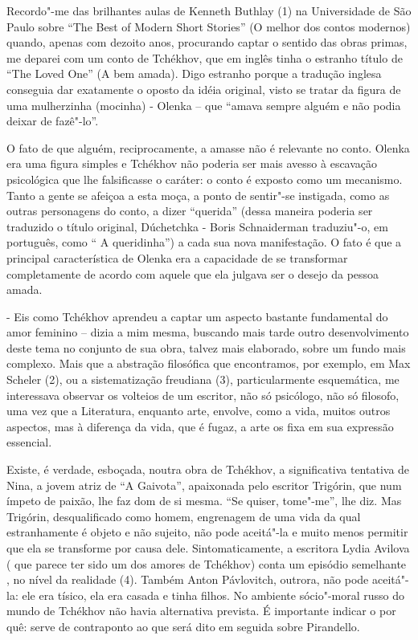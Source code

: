 Recordo"-me das brilhantes aulas de Kenneth Buthlay (1) na Universidade
de São Paulo sobre ``The Best of Modern Short Stories'' (O melhor dos
contos modernos) quando, apenas com dezoito anos, procurando captar o
sentido das obras primas, me deparei com um conto de Tchékhov, que em
inglês tinha o estranho título de ``The Loved One'' (A bem amada). Digo
estranho porque a tradução inglesa conseguia dar exatamente o oposto da
idéia original, visto se tratar da figura de uma mulherzinha (mocinha) -
Olenka -- que ``amava sempre alguém e não podia deixar de fazê"-lo''.

O fato de que alguém, reciprocamente, a amasse não é relevante no conto.
Olenka era uma figura simples e Tchékhov não poderia ser mais avesso à
escavação psicológica que lhe falsificasse o caráter: o conto é exposto
como um mecanismo. Tanto a gente se afeiçoa a esta moça, a ponto de
sentir"-se instigada, como as outras personagens do conto, a dizer
``querida'' (dessa maneira poderia ser traduzido o título original,
Dúchetchka - Boris Schnaiderman traduziu"-o, em português, como `` A
queridinha'') a cada sua nova manifestação. O fato é que a principal
característica de Olenka era a capacidade de se transformar
completamente de acordo com aquele que ela julgava ser o desejo da
pessoa amada.

- Eis como Tchékhov aprendeu a captar um aspecto bastante fundamental do
amor feminino -- dizia a mim mesma, buscando mais tarde outro
desenvolvimento deste tema no conjunto de sua obra, talvez mais
elaborado, sobre um fundo mais complexo. Mais que a abstração filosófica
que encontramos, por exemplo, em Max Scheler (2), ou a sistematização
freudiana (3), particularmente esquemática, me interessava observar os
volteios de um escritor, não só psicólogo, não só filosofo, uma vez que
a Literatura, enquanto arte, envolve, como a vida, muitos outros
aspectos, mas à diferença da vida, que é fugaz, a arte os fixa em sua
expressão essencial.

Existe, é verdade, esboçada, noutra obra de Tchékhov, a significativa
tentativa de Nina, a jovem atriz de ``A Gaivota'', apaixonada pelo
escritor Trigórin, que num ímpeto de paixão, lhe faz dom de si mesma.
``Se quiser, tome"-me'', lhe diz. Mas Trigórin, desqualificado como
homem, engrenagem de uma vida da qual estranhamente é objeto e não
sujeito, não pode aceitá"-la e muito menos permitir que ela se transforme
por causa dele. Sintomaticamente, a escritora Lydia Avilova ( que parece
ter sido um dos amores de Tchékhov) conta um episódio semelhante , no
nível da realidade (4). Também Anton Pávlovitch, outrora, não pode
aceitá"-la: ele era tísico, ela era casada e tinha filhos. No ambiente
sócio"-moral russo do mundo de Tchékhov não havia alternativa prevista. É
importante indicar o por quê: serve de contraponto ao que será dito em
seguida sobre Pirandello.

